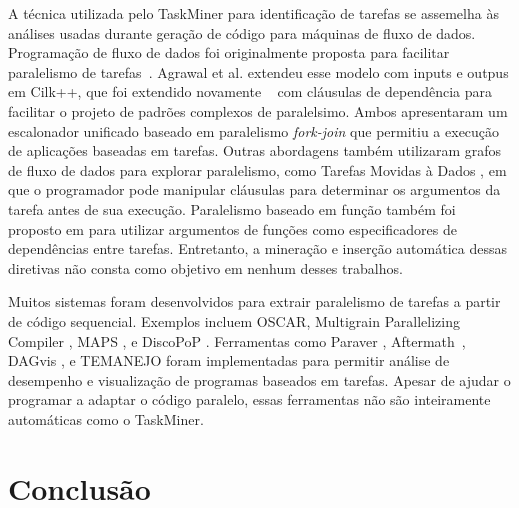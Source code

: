 \documentclass[sigplan,10pt,review]{acmart}
\newcommand\Taskminer{\mbox{\textsf{TaskMiner}}}
\begin{document}
A técnica utilizada pelo {\Taskminer} para identificação de tarefas se assemelha às análises usadas durante
geração de código para máquinas de fluxo de dados. Programação de fluxo de dados foi originalmente proposta 
para facilitar paralelismo de tarefas~\cite{gupta:micro:2011}. Agrawal et al. \cite{agrawal:ipdps:2010} extendeu esse modelo
com inputs e outpus em Cilk++, que foi extendido novamente ~\cite{vandierendonck:hotpar:2011} 
com cláusulas de dependência para facilitar
o projeto de padrões complexos de paralelsimo. Ambos apresentaram um escalonador unificado
baseado em paralelismo \textit{fork-join} que permitiu
a execução de aplicações baseadas em tarefas. Outras abordagens também utilizaram grafos
de fluxo de dados para explorar paralelismo, como Tarefas Movidas à Dados \cite{tasirlar:icpp:2011},
em que o programador pode manipular cláusulas para determinar os argumentos da tarefa
antes de sua execução. Paralelismo baseado em função também foi proposto em \cite{gupta:micro:2011}
para utilizar argumentos de funções como especificadores de dependências entre tarefas.
Entretanto, a mineração e inserção automática dessas diretivas não consta como objetivo
em nenhum desses trabalhos.

Muitos sistemas foram desenvolvidos para extrair paralelismo de tarefas a partir de código sequencial.
Exemplos incluem OSCAR, Multigrain Parallelizing
Compiler \cite{kasahara:iwlcpc:2000},  MAPS \cite{ceng:dac:2008}, e
DiscoPoP \cite{discopop, li:jss:2016}. Ferramentas como Paraver \cite{paraver},
Aftermath~\cite{drebes:hipeac:2014}, DAGvis \cite{huynh:wvpa:2015}, e TEMANEJO
\cite{brinkmann:parco:2011} foram implementadas para 
permitir análise de desempenho e visualização de programas baseados em tarefas.
Apesar de ajudar o programar a adaptar o código paralelo, essas ferramentas não são 
inteiramente automáticas como o {\Taskminer}.


\section{Conclus\~{a}o}
\label{sec:conc}



\end{document}
